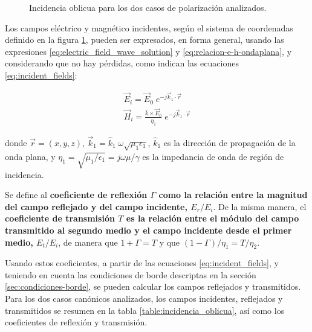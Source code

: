 \begin{figure} [H]
	\centering 
	\hspace{5mm}
	\caption{Incidencia oblicua para los dos casos de polarización analizados.}
	\label{fig:oblique_incidence}
\end{figure}

Los campos eléctrico y magnético incidentes, según el sistema de coordenadas definido en la figura \ref{fig:oblique_incidence}, pueden ser expresados, en forma general, usando las expresiones \ref{eq:electric_field_wave_solution} y \ref{eq:relacion-e-h-ondaplana}, y considerando que no hay pérdidas, como indican las ecuaciones \ref{eq:incident_fields}:

\begin{subequations}
	\label{eq:incident_fields}
	\begin{align}
	\vec{E}_i = \vec{E}_0 \;e^{-j\vec{k}_1 \cdot \vec{r}} \\
	\vec{H}_i = \frac{\hat{k} \times \vec{E}_0}{\eta_1} \;e^{-j\vec{k}_1 \cdot \vec{r}}
	\end{align}
\end{subequations}

donde $\vec{r}=(x,y,z)$, $\vec{k}_1 = \hat{k}_1 \;\omega \sqrt{\mu_1 \epsilon_1}$, $\hat{k}_1$ es la dirección de propagación de la onda plana, y $\eta_1 = \sqrt{\mu_1 / \epsilon_1} = j\omega \mu / \gamma$ es la impedancia de onda de región de incidencia.

Se define al \textbf{coeficiente de reflexión $\Gamma$ como la relación entre la magnitud del campo reflejado y del campo incidente, $E_r / E_i$}. De la misma manera, el \textbf{coeficiente de transmisión $T$ es la relación entre el módulo del campo transmitido al segundo medio y el campo incidente desde el primer medio, $E_t / E_i$}, de manera que $1+\Gamma = T$ y que $(1-\Gamma)/\eta_1 = T/\eta_2$. 

Usando estos coeficientes, a partir de las ecuaciones \ref{eq:incident_fields}, y teniendo en cuenta las condiciones de borde descriptas en la sección \ref{sec:condiciones-borde}, se pueden calcular los campos reflejados y transmitidos. Para los dos casos canónicos analizados, los campos incidentes, reflejados y transmitidos se resumen en la tabla \ref{table:incidencia_oblicua}, así como los coeficientes de reflexión y transmisión.

